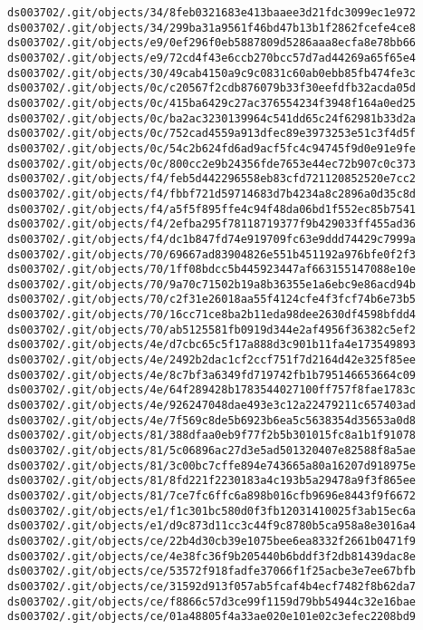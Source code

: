 \documentclass[11pt]{article}
\begin{document}
\begin{Verbatim}[commandchars=\\\{\}]
ds003702/.git/objects/34/8feb0321683e413baaee3d21fdc3099ec1e972
ds003702/.git/objects/34/299ba31a9561f46bd47b13b1f2862fcefe4ce8
ds003702/.git/objects/e9/0ef296f0eb5887809d5286aaa8ecfa8e78bb66
ds003702/.git/objects/e9/72cd4f43e6ccb270bcc57d7ad44269a65f65e4
ds003702/.git/objects/30/49cab4150a9c9c0831c60ab0ebb85fb474fe3c
ds003702/.git/objects/0c/c20567f2cdb876079b33f30eefdfb32acda05d
ds003702/.git/objects/0c/415ba6429c27ac376554234f3948f164a0ed25
ds003702/.git/objects/0c/ba2ac3230139964c541dd65c24f62981b33d2a
ds003702/.git/objects/0c/752cad4559a913dfec89e3973253e51c3f4d5f
ds003702/.git/objects/0c/54c2b624fd6ad9acf5fc4c94745f9d0e91e9fe
ds003702/.git/objects/0c/800cc2e9b24356fde7653e44ec72b907c0c373
ds003702/.git/objects/f4/feb5d442296558eb83cfd721120852520e7cc2
ds003702/.git/objects/f4/fbbf721d59714683d7b4234a8c2896a0d35c8d
ds003702/.git/objects/f4/a5f5f895ffe4c94f48da06bd1f552ec85b7541
ds003702/.git/objects/f4/2efba295f78118719377f9b429033ff455ad36
ds003702/.git/objects/f4/dc1b847fd74e919709fc63e9ddd74429c7999a
ds003702/.git/objects/70/69667ad83904826e551b451192a976bfe0f2f3
ds003702/.git/objects/70/1ff08bdcc5b445923447af663155147088e10e
ds003702/.git/objects/70/9a70c71502b19a8b36355e1a6ebc9e86acd94b
ds003702/.git/objects/70/c2f31e26018aa55f4124cfe4f3fcf74b6e73b5
ds003702/.git/objects/70/16cc71ce8ba2b11eda98dee2630df4598bfdd4
ds003702/.git/objects/70/ab5125581fb0919d344e2af4956f36382c5ef2
ds003702/.git/objects/4e/d7cbc65c5f17a888d3c901b11fa4e173549893
ds003702/.git/objects/4e/2492b2dac1cf2ccf751f7d2164d42e325f85ee
ds003702/.git/objects/4e/8c7bf3a6349fd719742fb1b795146653664c09
ds003702/.git/objects/4e/64f289428b1783544027100ff757f8fae1783c
ds003702/.git/objects/4e/926247048dae493e3c12a22479211c657403ad
ds003702/.git/objects/4e/7f569c8de5b6923b6ea5c5638354d35653a0d8
ds003702/.git/objects/81/388dfaa0eb9f77f2b5b301015fc8a1b1f91078
ds003702/.git/objects/81/5c06896ac27d3e5ad501320407e82588f8a5ae
ds003702/.git/objects/81/3c00bc7cffe894e743665a80a16207d918975e
ds003702/.git/objects/81/8fd221f2230183a4c193b5a29478a9f3f865ee
ds003702/.git/objects/81/7ce7fc6ffc6a898b016cfb9696e8443f9f6672
ds003702/.git/objects/e1/f1c301bc580d0f3fb12031410025f3ab15ec6a
ds003702/.git/objects/e1/d9c873d11cc3c44f9c8780b5ca958a8e3016a4
ds003702/.git/objects/ce/22b4d30cb39e1075bee6ea8332f2661b0471f9
ds003702/.git/objects/ce/4e38fc36f9b205440b6bddf3f2db81439dac8e
ds003702/.git/objects/ce/53572f918fadfe37066f1f25acbe3e7ee67bfb
ds003702/.git/objects/ce/31592d913f057ab5fcaf4b4ecf7482f8b62da7
ds003702/.git/objects/ce/f8866c57d3ce99f1159d79bb54944c32e16bae
ds003702/.git/objects/ce/01a48805f4a33ae020e101e02c3efec2208bd9

\end{Verbatim}
\end{document}
